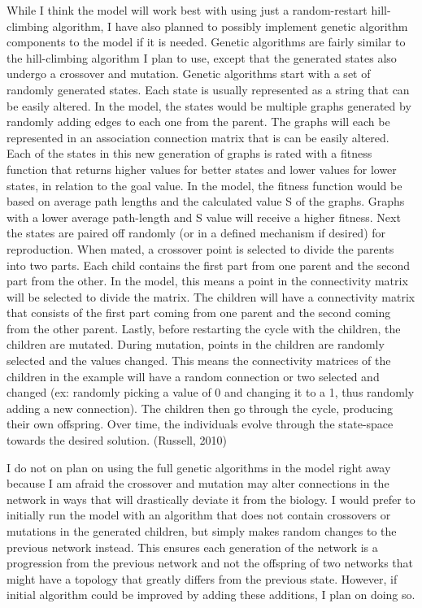 \documentclass[11pt,letterpaper,doublespacing,titlepage]{article}
\begin{document}
\par
While I think the model will work best with using just a random-restart hill-climbing algorithm, I have also planned to possibly implement genetic algorithm components to the model if it is needed. Genetic algorithms are fairly similar to the hill-climbing algorithm I plan to use, except that the generated states also undergo a crossover and mutation. Genetic algorithms start with a set of randomly generated states. Each state is usually represented as a string that can be easily altered. In the model, the states would be multiple graphs generated by randomly adding edges to each one from the parent. The graphs will each be represented in an association connection matrix that is can be easily altered. Each of the states in this new generation of graphs is rated with a fitness function that returns higher values for better states and lower values for lower states, in relation to the goal value. In the model, the fitness function would be based on average path lengths and the calculated value S of the graphs. Graphs with a lower average path-length and S value will receive a higher fitness. Next the states are paired off randomly (or in a defined mechanism if desired) for reproduction. When mated, a crossover point is selected to divide the parents into two parts. Each child contains the first part from one parent and the second part from the other. In the model, this means a point in the connectivity matrix will be selected to divide the matrix. The children will have a connectivity matrix that consists of the first part coming from one parent and the second coming from the other parent. Lastly, before restarting the cycle with the children, the children are mutated. During mutation, points in the children are randomly selected and the values changed. This means the connectivity matrices of the children in the example will have a random connection or two selected and changed (ex: randomly picking a value of 0 and changing it to a 1, thus randomly adding a new connection). The children then go through the cycle, producing their own offspring. Over time, the individuals evolve through the state-space towards the desired solution. (Russell, 2010)
\par
I do not on plan on using the full genetic algorithms in the model right away because I am afraid the crossover and mutation may alter connections in the network in ways that will drastically deviate it from the biology. I would prefer to initially run the model with an algorithm that does not contain crossovers or mutations in the generated children, but simply makes random changes to the previous network instead. This ensures each generation of the network is a progression from the previous network and not the offspring of two networks that might have a topology that greatly differs from the previous state. However, if initial algorithm could be improved by adding these additions, I plan on doing so.
\end{document}
